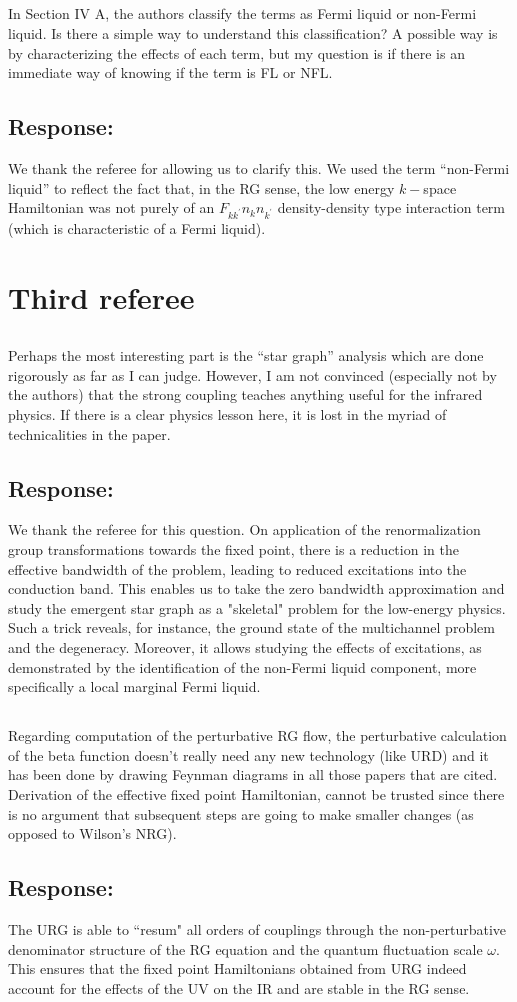 \documentclass{article}
\newcommand{\response}[1]{{\color{blue}\subsection*{Response:}{#1}}}
\newcommand{\point}[1]{\subsection{}{#1}}
\begin{document}
\point{
In Section IV A, the authors classify the terms as Fermi liquid or non-Fermi liquid. Is there a simple way to understand this classification? A possible way is by characterizing the effects of each term, but my question is if there is an immediate way of knowing if the term is FL or NFL.}

\response{ We thank the referee for allowing us to clarify this. We used the term “non-Fermi liquid” to reflect the fact that, in the RG sense, the low energy $k−$space Hamiltonian was not purely of an $F_{kk^\prime} n_k n_{k^\prime}$ density-density type interaction term (which is characteristic of a Fermi liquid).} 

\section{Third referee}

\point{
Perhaps the most interesting part is the “star graph” analysis which
are done rigorously as far as I can judge. However, I am not convinced
(especially not by the authors) that the strong coupling teaches
anything useful for the infrared physics. If there is a clear physics
lesson here, it is lost in the myriad of technicalities in the paper.
}

\response{We thank the referee for this question. On application of the renormalization group transformations towards the fixed point, there is a reduction in the effective bandwidth of the problem, leading to reduced excitations into the conduction band. This enables us to take the zero bandwidth approximation and study the emergent star graph as a "skeletal" problem for the low-energy physics. Such a trick reveals, for instance, the ground state of the multichannel problem and the degeneracy. Moreover, it allows studying the effects of excitations, as demonstrated by the identification of the non-Fermi liquid component, more specifically a local marginal Fermi liquid.
}

\point{
Regarding computation of the perturbative RG flow, the perturbative
calculation of the beta function doesn’t really need any new
technology (like URD) and it has been done by drawing Feynman diagrams
in all those papers that are cited. Derivation of the effective fixed
point Hamiltonian, cannot be trusted since there is no argument that
subsequent steps are going to make smaller changes (as opposed to
Wilson’s NRG).
}

\response{
The URG is able to ``resum" all orders of couplings through the non-perturbative denominator structure of the RG equation and the quantum fluctuation scale \(\omega\). This ensures that the fixed point Hamiltonians obtained from URG indeed account for the effects of the UV on the IR and are stable in the RG sense.
}
\end{document}
